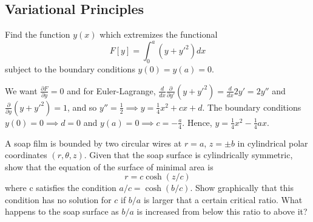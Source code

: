 \documentclass[a4paper]{article}
\begin{document}
\subsection*{Variational Principles}
\begin{qns}
Find the function $y(x)$ which extremizes the functional
$$F[y]=\int_0^a(y+y'^2)dx$$
subject to the boundary conditions $y(0)=y(a)=0$.
\end{qns}
\begin{ans}
We want $\frac{\partial F}{\partial y}=0$ and for Euler-Lagrange, $\frac{d}{dx}\frac{\partial}{\partial y'}(y+y'^2)=\frac{d}{dx}2y'=2y''$ and $\frac{\partial}{\partial y}(y+y'^2)=1$, and so $y''=\frac{1}{2}\implies y=\frac{1}{4}x^2+cx+d$. The boundary conditions $y(0)=0\implies d=0$ and $y(a)=0\implies c=-\frac{a}{4}$. Hence, $y=\frac{1}{4}x^2-\frac{1}{4}ax$.  
\end{ans}
\begin{qns}
A soap film is bounded by two circular wires at $r = a$, $z =\pm b$ in cylindrical polar coordinates $(r,\theta,z)$. Given that the soap surface is cylindrically symmetric, show that the equation of the surface of minimal area is
$$r=c\cosh(z/c)$$
where c satisfies the condition $a/c=\cosh(b/c)$. Show graphically that this condition has no solution for $c$ if $b/a$ is larger that a certain critical ratio. What happens to the soap surface as $b/a$ is increased from below this ratio to above it?
\end{qns}
\end{document}

